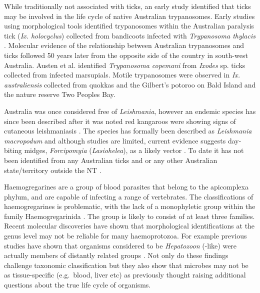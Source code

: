 \documentclass[a4paper, nobind]{templates/ociamthesis}
\begin{document}
While traditionally not associated with ticks, an early study identified that ticks may be involved in the life cycle of native Australian trypanosomes.
Early studies using morphological tools identified trypanosomes within the Australian paralysis tick (\emph{Ix. holocyclus}) collected from bandicoots infected with \emph{Trypanosoma thylacis} \autocite{mackerrasHaematozoaAustralianMammals1959}.
Molecular evidence of the relationship between Australian trypanosomes and ticks followed 50 years later from the opposite side of the country in south-west Australia.
Austen et al. \autocite*{austenVectorTrypanosomaCopemani2011} identified \emph{Trypanosoma copemani} from \emph{Ixodes} sp. ticks collected from infected marsupials.
Motile trypanosomes were observed in \emph{Ix. australiensis} collected from quokkas and the Gilbert's potoroo on Bald Island and the nature reserve Two Peoples Bay.

Australia was once considered free of \emph{Leishmania}, however an endemic species has since been described after it was noted red kangaroos were showing signs of cutaneous leishmaniasis \autocite{roseCutaneousLeishmaniasisRed2004}.
The species has formally been described as \emph{Leishmania macropodum} \autocite{barrattIsolationNovelTrypanosomatid2017} and although studies are limited, current evidence suggests day-biting midges, \emph{Forcipomyia} (\emph{Lasiohelea}), as a likely vector \autocite{dougallEvidenceIncriminatingMidges2011,panahiUtilisingNovelSurveillance2020}.
To date it has not been identified from any Australian ticks and or any other Australian state/territory outside the NT \autocite{cleareRemainingVigilantExotic2014,dybingGhostsChristmasAbsence2016,thompsonExoticParasiteThreats2018}.

Haemogregarines are a group of blood parasites that belong to the apicomplexa phylum, and are capable of infecting a range of vertebrates.
The classifications of haemogregarines is problematic, with the lack of a monophyletic group within the family Haemogregarinida \autocite{al-quraishyHaemogregarinesCriteriaIdentification2021}. The group is likely to consist of at least three families.
Recent molecular discoveries have shown that morphological identifications at the genus level may not be reliable for many haemoprotozoa.
For example previous studies have shown that organisms considered to be \emph{Hepatozoon} (-like) were actually members of distantly related groups \autocite{merinoSarcocystidMisidentifiedHepatozoon2008,zhuLooksCanDeceive2009}.
Not only do these findings challenge taxonomic classification but they also show that microbes may not be as tissue-specific (e.g.~blood, liver etc) as previously thought raising additional questions about the true life cycle of organisms.
\end{document}
